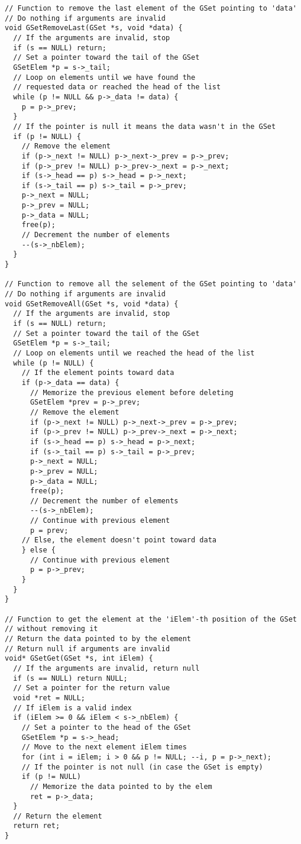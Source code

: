 \documentclass[12pt, a4paper]{article}
\begin{document}
\begin{scriptsize}
\begin{ttfamily}
\begin{lstlisting}
// Function to remove the last element of the GSet pointing to 'data'
// Do nothing if arguments are invalid
void GSetRemoveLast(GSet *s, void *data) {
  // If the arguments are invalid, stop
  if (s == NULL) return;
  // Set a pointer toward the tail of the GSet
  GSetElem *p = s->_tail;
  // Loop on elements until we have found the 
  // requested data or reached the head of the list
  while (p != NULL && p->_data != data) {
    p = p->_prev;
  }
  // If the pointer is null it means the data wasn't in the GSet
  if (p != NULL) {
    // Remove the element
    if (p->_next != NULL) p->_next->_prev = p->_prev;
    if (p->_prev != NULL) p->_prev->_next = p->_next;
    if (s->_head == p) s->_head = p->_next;
    if (s->_tail == p) s->_tail = p->_prev;
    p->_next = NULL;
    p->_prev = NULL;
    p->_data = NULL;
    free(p);
    // Decrement the number of elements
    --(s->_nbElem);
  }
}

// Function to remove all the selement of the GSet pointing to 'data'
// Do nothing if arguments are invalid
void GSetRemoveAll(GSet *s, void *data) {
  // If the arguments are invalid, stop
  if (s == NULL) return;
  // Set a pointer toward the tail of the GSet
  GSetElem *p = s->_tail;
  // Loop on elements until we reached the head of the list
  while (p != NULL) {
    // If the element points toward data
    if (p->_data == data) {
      // Memorize the previous element before deleting
      GSetElem *prev = p->_prev;
      // Remove the element
      if (p->_next != NULL) p->_next->_prev = p->_prev;
      if (p->_prev != NULL) p->_prev->_next = p->_next;
      if (s->_head == p) s->_head = p->_next;
      if (s->_tail == p) s->_tail = p->_prev;
      p->_next = NULL;
      p->_prev = NULL;
      p->_data = NULL;
      free(p);
      // Decrement the number of elements
      --(s->_nbElem);
      // Continue with previous element
      p = prev;
    // Else, the element doesn't point toward data
    } else {
      // Continue with previous element
      p = p->_prev;
    }
  }
}

// Function to get the element at the 'iElem'-th position of the GSet
// without removing it
// Return the data pointed to by the element
// Return null if arguments are invalid
void* GSetGet(GSet *s, int iElem) {
  // If the arguments are invalid, return null
  if (s == NULL) return NULL;
  // Set a pointer for the return value
  void *ret = NULL;
  // If iElem is a valid index
  if (iElem >= 0 && iElem < s->_nbElem) {
    // Set a pointer to the head of the GSet
    GSetElem *p = s->_head;
    // Move to the next element iElem times
    for (int i = iElem; i > 0 && p != NULL; --i, p = p->_next);
    // If the pointer is not null (in case the GSet is empty)
    if (p != NULL)
      // Memorize the data pointed to by the elem
      ret = p->_data;
  }
  // Return the element
  return ret;
}


\end{lstlisting}
\end{ttfamily}
\end{scriptsize}
\end{document}
